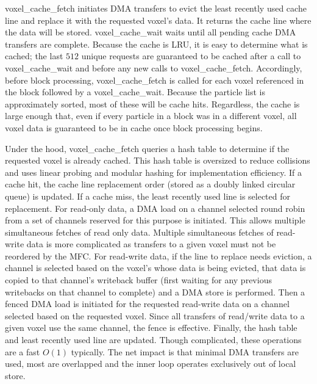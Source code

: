 \documentclass[journal,twoside]{IEEEtran}
\begin{document}
voxel\_cache\_fetch initiates DMA transfers to evict the least
recently used cache line and replace it with the requested voxel's
data.  It returns the cache line where the data will be stored.
voxel\_cache\_wait waits until all pending cache DMA transfers are
complete.  Because the cache is LRU, it is easy to determine what is
cached; the last $512$ unique requests are guaranteed to be cached
after a call to voxel\_cache\_wait and before any new calls to
voxel\_cache\_fetch.  Accordingly, before block processing,
voxel\_cache\_fetch is called for each voxel referenced in the block
followed by a voxel\_cache\_wait.  Because the particle list is
approximately sorted, most of these will be cache hits.  Regardless,
the cache is large enough that, even if every particle in a block was
in a different voxel, all voxel data is guaranteed to be in cache once
block processing begins.

Under the hood, voxel\_cache\_fetch queries a hash table to determine
if the requested voxel is already cached.  This hash table is
oversized to reduce collisions and uses linear probing and modular
hashing for implementation efficiency.  If a cache hit, the cache line
replacement order (stored as a doubly linked circular queue) is
updated.  If a cache miss, the least recently used line is selected
for replacement.  For read-only data, a DMA load on a channel selected
round robin from a set of channels reserved for this purpose is
initiated.  This allows multiple simultaneous fetches of read only
data.  Multiple simultaneous fetches of read-write data is more
complicated as transfers to a given voxel must not be reordered by the
MFC.  For read-write data, if the line to replace needs eviction, a
channel is selected based on the voxel's whose data is being evicted,
that data is copied to that channel's writeback buffer (first waiting
for any previous writebacks on that channel to complete) and a DMA
store is performed.  Then a fenced DMA load is initiated for the
requested read-write data on a channel selected based on the requested
voxel.  Since all transfers of read/write data to a given voxel use
the same channel, the fence is effective.  Finally, the hash table and
least recently used line are updated.  Though complicated, these
operations are a fast $O(1)$ typically.  The net impact is that
minimal DMA transfers are used, most are overlapped and the inner loop
operates exclusively out of local store.

\end{document}
